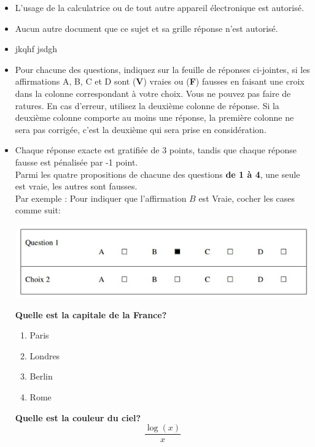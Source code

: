 \documentclass{book}%
\begin{document}
\begin{itemize}%
\item%
L'usage de la calculatrice ou de tout autre appareil électronique est autorisé.%
\item%
Aucun autre document que ce sujet et sa grille réponse n'est autorisé.%
\item%
jkqhf jsdgh%
\item%
Pour chacune des questions, indiquez sur la feuille de réponses ci-jointes, si les affirmations A, B, C et D sont (\textbf{V}) vraies ou (\textbf{F}) fausses en faisant une croix dans la colonne correspondant à votre choix. Vous ne pouvez pas faire de ratures. En cas d'erreur, utilisez la deuxième colonne de réponse. Si la deuxième colonne comporte au moins une réponse, la première colonne ne sera pas corrigée, c'est la deuxième qui sera prise en considération.%
\item%
Chaque réponse exacte est gratifiée de 3 points, tandis que chaque réponse fausse est pénalisée par -1 point. \\ 	Parmi les quatre propositions de chacune des questions \textbf{de 1 à 4}, une seule est vraie, les autres sont fausses. \\ 	Par exemple : Pour indiquer que l'affirmation $B$ est Vraie, cocher les cases comme suit:  \\ \begin{center}	\includegraphics[scale=0.8]{reponses.png} \end{center}%
\begin{exercise}%
\textbf{Quelle est la capitale de la France? }%
\begin{enumerate}[label=\textbf{\Alph*. }]%
\item%
Paris%
\item%
Londres%
\item%
Berlin%
\item%
Rome%
\end{enumerate}%
\end{exercise}%
\begin{exercise}%
\textbf{Quelle est la couleur du ciel? $$ \frac{\log(x)}{x} $$ }%
\begin{enumerate}[label=\textbf{\Alph*. }]%

\end{enumerate}
\end{exercise}
\end{itemize}
\end{document}
